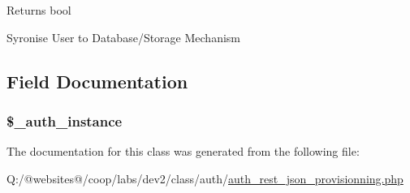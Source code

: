 \begin{DoxyReturn}{Returns}
bool 
\end{DoxyReturn}
Syronise User to Database/\-Storage Mechanism

\subsection{Field Documentation}
\hypertarget{class_xortify_auth_rest___json_provisionning_a486ed878bb5a7188c99ac4c9ee46ac6e}{
\subsubsection[{\$\-\_\-auth\-\_\-instance}]{\setlength{\rightskip}{0pt plus 5cm}\$\-\_\-auth\-\_\-instance}}\label{class_xortify_auth_rest___json_provisionning_a486ed878bb5a7188c99ac4c9ee46ac6e}


The documentation for this class was generated from the following file\-:\begin{DoxyCompactItemize}
\item 
Q\-:/@websites@/coop/labs/dev2/class/auth/\hyperlink{auth__rest__json__provisionning_8php}{auth\-\_\-rest\-\_\-json\-\_\-provisionning.\-php}\end{DoxyCompactItemize}
